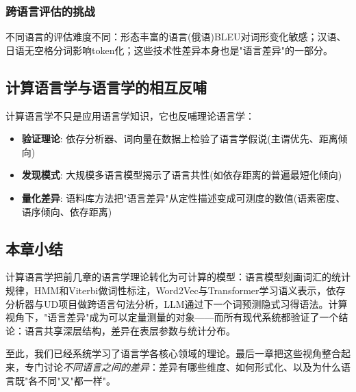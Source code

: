 \subsubsection{跨语言评估的挑战}

不同语言的评估难度不同：形态丰富的语言(俄语)BLEU对词形变化敏感；汉语、日语无空格分词影响token化；这些技术性差异本身也是"语言差异"的一部分。

\subsection{计算语言学与语言学的相互反哺}

计算语言学不只是应用语言学知识，它也反哺理论语言学：
\begin{itemize}
    \item \textbf{验证理论}: 依存分析器、词向量在数据上检验了语言学假说(主谓优先、距离倾向)
    \item \textbf{发现模式}: 大规模多语言模型揭示了语言共性(如依存距离的普遍最短化倾向)
    \item \textbf{量化差异}: 语料库方法把"语言差异"从定性描述变成可测度的数值(语素密度、语序倾向、依存距离)
\end{itemize}

\subsection{本章小结}

计算语言学把前几章的语言学理论转化为可计算的模型：语言模型刻画词汇的统计规律，HMM和Viterbi做词性标注，Word2Vec与Transformer学习语义表示，依存分析器与UD项目做跨语言句法分析，LLM通过下一个词预测隐式习得语法。计算视角下，"语言差异"成为可以定量测量的对象——而所有现代系统都验证了一个结论：语言共享深层结构，差异在表层参数与统计分布。

至此，我们已经系统学习了语言学各核心领域的理论。最后一章把这些视角整合起来，专门讨论\emph{不同语言之间的差异}：差异有哪些维度、如何形式化、以及为什么语言既"各不同"又"都一样"。
